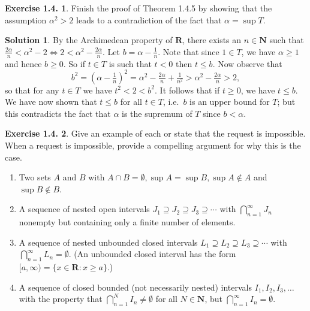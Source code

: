 \documentclass[12pt]{article}
\theoremstyle{definition}
\theoremstyle{exercise}
\newtheorem{exercise}{Exercise 1.4.}
\theoremstyle{solution}
\newtheorem*{solution}{Solution}
\newcommand{\N}{\mathbf{N}}
\newcommand{\R}{\mathbf{R}}
\begin{document}
\begin{exercise}
\label{ex:7}
    Finish the proof of Theorem 1.4.5 by showing that the assumption \( \alpha^2 > 2 \) leads to a contradiction of the fact that \( \alpha = \sup T \).
\end{exercise}

\begin{solution}
    By the Archimedean property of \( \R \), there exists an \( n \in \N \) such that \( \tfrac{2 \alpha}{n} < \alpha^2 - 2 \iff 2 < \alpha^2 - \tfrac{2 \alpha}{n} \). Let \( b = \alpha - \tfrac{1}{n} \). Note that since \( 1 \in T \), we have \( \alpha \geq 1 \) and hence \( b \geq 0 \). So if \( t \in T \) is such that \( t < 0 \) then \( t \leq b \). Now observe that
    \[
        b^2 = \left( \alpha - \tfrac{1}{n} \right)^2 = \alpha^2 - \tfrac{2 \alpha}{n} + \tfrac{1}{n^2} > \alpha^2 - \tfrac{2 \alpha}{n} > 2,
    \]
    so that for any \( t \in T \) we have \( t^2 < 2 < b^2 \). It follows that if \( t \geq 0 \), we have \( t \leq b \). We have now shown that \( t \leq b \) for all \( t \in T \), i.e.\ \( b \) is an upper bound for \( T \); but this contradicts the fact that \( \alpha \) is the supremum of \( T \) since \( b < \alpha \).
\end{solution}

\begin{exercise}
\label{ex:8}
    Give an example of each or state that the request is impossible. When a request is impossible, provide a compelling argument for why this is the case.
    \begin{enumerate}
        \item Two sets \( A \) and \( B \) with \( A \cap B = \emptyset, \sup A = \sup B, \sup A \not\in A \) and \( \sup B \not\in B \).

        \item A sequence of nested open intervals \( J_1 \supseteq J_2 \supseteq J_3 \supseteq \cdots \) with \( \bigcap_{n=1}^{\infty} J_n \) nonempty but containing only a finite number of elements.

        \item A sequence of nested unbounded closed intervals \( L_1 \supseteq L_2 \supseteq L_3 \supseteq \cdots \) with \( \bigcap_{n=1}^{\infty} L_n = \emptyset \). (An unbounded closed interval has the form \( [a, \infty) = \{ x \in \R : x \geq a \} \).)

        \item A sequence of closed bounded (not necessarily nested) intervals \( I_1, I_2, I_3, \ldots \) with the property that \( \bigcap_{n=1}^N I_n \neq \emptyset \) for all \( N \in \N \), but \( \bigcap_{n=1}^{\infty} I_n = \emptyset \).
    \end{enumerate}
\end{exercise}
\end{document}

